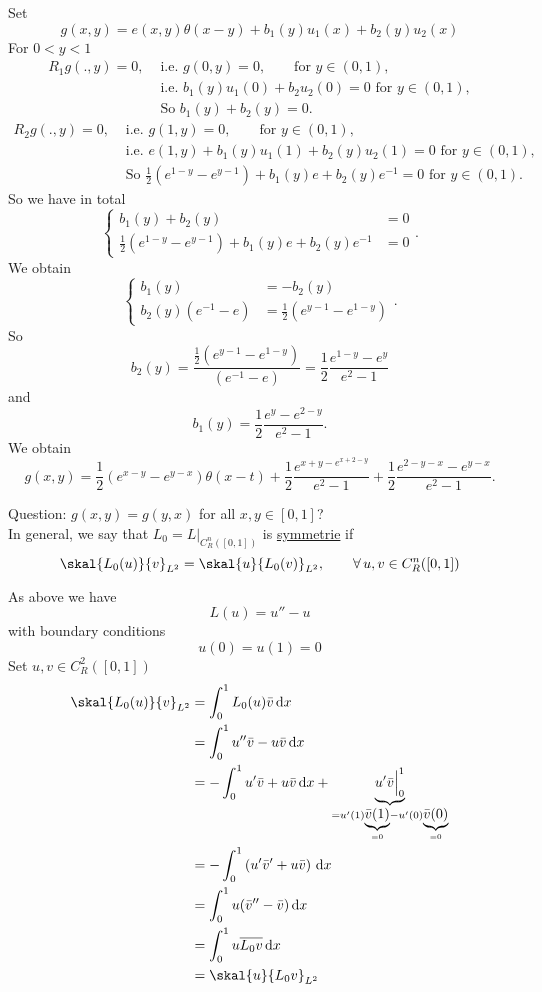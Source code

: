Set 
\[
	g(x,y) = e(x,y)\theta(x-y) + b_1(y)u_1(x)+ b_2(y)u_2(x)
\]
For $0<y<1$
\begin{align*}
	R_1g(.,y)=0, &\text{ i.e. }g(0,y)=0, \qquad \text{for }y \in (0,1), \\
	 &\text{ i.e. }b_1(y)u_1(0)+ b_2u_2(0) = 0 \text{ for }y \in (0,1), \\
	 &\text{ So $b_1(y) + b_2(y) = 0$}.
\end{align*}
\begin{align*}
	R_2g(.,y)=0, &\text{ i.e. }g(1,y)=0, \qquad \text{for }y \in (0,1), \\
	 &\text{ i.e. }e(1,y) + b_1(y)u_1(1)+ b_2(y)u_2(1) = 0 \text{ for }y \in (0,1), \\
	 &\text{ So }\frac{1}{2}\left( e^{1-y}- e^{y-1} \right) + b_1(y)e + b_2(y)e^{-1}=0 \text{ for }y \in (0,1).
\end{align*}
So we have in total
\[
	\begin{cases}
		b_1(y) + b_2(y) &= 0 \\
		\frac{1}{2}\left( e^{1-y}- e^{y-1} \right) + b_1(y)e + b_2(y)e^{-1} &=0 
	\end{cases}.
\]
We obtain
\[
	\begin{cases}
		b_1(y) &= -b_2(y) \\
		b_2(y)\left(  e^{-1} - e \right) &= \frac{1}{2}\left( e^{y-1}- e^{1-y} \right)
	\end{cases}.
\]
So
\[
	b_2(y) = \frac{\frac{1}{2}(e^{y-1}-e^{1-y})}{\left( e^{-1}-e \right)} = \frac{1}{2} \frac{e^{1-y}-e^{y}}{e^2-1}
\]
and
\[
	b_1(y) = \frac{1}{2} \frac{e^y-e^{2-y}}{e^2 -1}.
\]
We obtain
\[
	g(x,y) = \frac{1}{2}(e^{x-y}- e^{y-x})\theta(x-t) + \frac{1}{2} \frac{e^{x+y-e^{x+2-y}}}{e^2-1} + \frac{1}{2} \frac{e^{2-y-x}-e^{y-x}}{e^2-1}.
\]

Question: $g(x,y)=g(y,x)$ for all $x,y \in [0,1]$? \\
In general, we say that $L_0 = L  \big|_{C^n_R([0,1])}^{}$ is \underline{symmetrie} if 
\[
	\skal{L_0(u)}{v}_{L^2} = \skal{u}{L_0(v)}_{L^2}, \qquad \forall\, u,v \in C_R^n([0,1])
\]

\begin{beispiel}[continue]
	As above we have
	\[
		L(u) = u'' - u
	\] with boundary conditions
	\[
		u(0)= u(1)=0
	\]
	Set $u,v \in C_R^2([0,1])$
	\begin{align*}
		\skal{L_0(u)}{v}_{L^2} &= \int_{0}^{1} L_0(u)\bar{v} \,\mathrm{d}x  \\ 
		&= \int_{0}^{1}u'' \bar{v}- u \bar{v} \,\mathrm{d}x \\  
		&= - \int_{0}^{1} u' \bar{v} + u \bar{v} \,\mathrm{d}x 
		+ \underset{=u'(1)\underset{=0}{\underbrace{\bar{v}(1)}}-u'(0) \underset{=0}{\underbrace{\bar{v}(0)}}}{\underbrace{u'\bar{v}  \Big|_{0}^{1}}} \\
		&= - \int_{0}^{1}\left( u' \bar{v}' + u \bar{v} \right) \,\mathrm{d}x \\
		&= \int_{0}^{1} u( \bar{v}'' - \bar{v}) \,\mathrm{d}x \\
		&= \int_{0}^{1} u \overline{L_0v} \,\mathrm{d}x \\
		&= \skal{u}{L_0v}_{L^2}
	\end{align*}
\end{beispiel}
